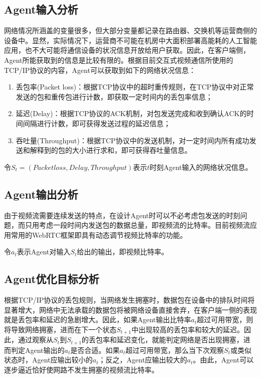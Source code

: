 \documentclass[a4paper]{ctexart}
\begin{document}
\subsection{Agent输入分析}

网络情况所涵盖的变量很多，但大部分变量都记录在路由器、交换机等运营商侧的设备中。显然，实际情况下，运营商不可能在机房中大面积部署高能耗的人工智能应用，也不大可能将通信设备的状况信息开放给用户获取。因此，在客户端侧，Agent所能获取到的信息是比较有限的。根据目前交互式视频通信所使用的TCP/IP协议的内容，Agent可以获取到如下的网络状况信息：

\begin{enumerate}[label=\arabic*、]
	\item 丢包率(Packet loss)：根据TCP协议中的超时重传规则，在TCP协议中对正常发送的包和重传包进行计数，即获取一定时间内的丢包率信息；
	\item 延迟(Delay)：根据TCP协议的ACK机制，对包发送完成和收到确认ACK的时间间隔进行计数，即可获得发送过程的延迟信息；
	\item 吞吐量(Throughput)：根据TCP协议中的发送机制，对一定时间内所有成功发送和解释到的包的大小进行求和，即可获得吞吐量信息。
\end{enumerate}

令$S_t=(Packet loss,Delay,Throughput)$表示$t$时刻Agent输入的网络状况信息。

\subsection{Agent输出分析}

由于视频流需要连续发送的特点，在设计Agent时可以不必考虑包发送的时刻问题，而只用考虑一段时间内发送包的数据总量，即视频流的比特率。目前视频流应用常用的WebRTC框架即具有动态调节视频比特率的功能。

令$a_t$表示Agent对输入$S_t$给出的输出，即视频比特率。

\subsection{Agent优化目标分析}

根据TCP/IP协议的丢包规则，当网络发生拥塞时，数据包在设备中的排队时间将显著增大，网络中无法承载的数据包将被网络设备直接舍弃，在客户端一侧的表现就是丢包率和延迟的急剧增大。因此，如果Agent输出比特率$a_t$超过可用带宽，则将导致网络拥塞，进而在下一个状态$S_{t+1}$中出现较高的丢包率和较大的延迟。因此，通过观察从$S_t$到$S_{t+1}$的丢包率和延迟变化，就能判定网络是否出现拥塞，进而判定Agent输出的$a_t$是否合适。如果$a_t$超过可用带宽，那么当下次观察$S_t$或类似状态时，Agent应输出较小的$a_t$；反之，Agent应输出较大的$a_t$。由此，Agent可以逐步逼近恰好使网路不发生拥塞的视频流比特率。
\end{document}
